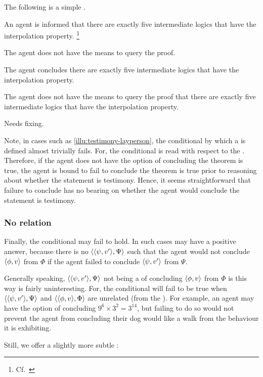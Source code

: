 \begin{note}
  The following is a simple .

  \begin{illustration}
    \label{illu:testimony-layperson}
    An agent is informed that there are exactly five intermediate logics that have the interpolation property.\nolinebreak
  \footnote{Cf.\ \textcite{Maksimova:1977un}}

    The agent does not have the means to query the proof.

    The agent concludes there are exactly five intermediate logics that have the interpolation property.
  \end{illustration}

  The agent does not have the means to query the proof that there are exactly five intermediate logics that have the interpolation property.
\end{note}

\begin{note}
  {
    \color{red}
    Needs fixing.
  }

  Note, in cases such as \autoref{illu:testimony-layperson}, the conditional by which a \requ{} is defined almost trivially fails.
  For, the conditional is read with respect to the \agpe{}.
  Therefore, if the agent does not have the option of concluding the theorem is true, the agent is bound to fail to conclude the theorem is true prior to reasoning about whether the statement is testimony.
  Hence, it seems straightforward that failure to conclude has no bearing on whether the agent would conclude the statement is testimony.
\end{note}

\subsubsection{No relation}

\begin{note}
  Finally, the conditional may fail to hold.
  In such cases \qzS{} may have a positive answer, because there is no \(\langle \langle \psi, v' \rangle, \Psi \rangle\) such that the agent would not conclude \(\langle \phi, v \rangle\) from \(\Phi\) if the agent failed to conclude \(\langle \psi, v' \rangle\) from \(\Psi\).

  Generally speaking, \(\langle \langle \psi, v' \rangle, \Psi \rangle\) not being a \requ{} of concluding \(\langle \phi, v \rangle\) from \(\Phi\) is this way is fairly uninteresting.
  For, the conditional will fail to be true when \(\langle \langle \psi, v' \rangle, \Psi \rangle\) and \(\langle \langle \phi, v \rangle, \Phi \rangle\) are unrelated (from the \agpe{}).
  For example, an agent may have the option of concluding \(9^{6} \times 3^{2} = 3^{14}\), but failing to do so would not prevent the agent from concluding their dog would like a walk from the behaviour it is exhibiting.

  Still, we offer a slightly more subtle :
\end{note}

